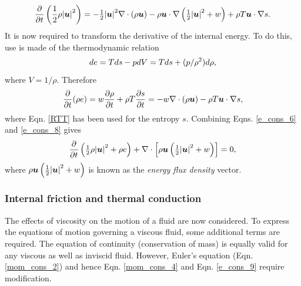 \begin{equation}\label{e_cons_6}
 \frac{\partial}{\partial{t}}\left(\frac{1}{2}\rho{|{\mbox{\boldmath$u$}}|}^{2}\right)=-{\textstyle \frac{1}{2}}{|{\mbox{\boldmath$u$}}|}^{2}\nabla\cdot(\rho{\mbox{\boldmath$u$}})
                                                                 -\rho{\mbox{\boldmath$u$}}\cdot\nabla\left({\textstyle \frac{1}{2}}{|{\mbox{\boldmath$u$}}|}^{2}+w\right)
                                                                 +\rho{T}{\mbox{\boldmath$u$}}\cdot\nabla{s}.
\end{equation}
It is now required to transform the derivative of the internal energy. To do this, use is made of the thermodynamic relation
\begin{equation}\label{e_cons_7}
 de=Tds-pdV=Tds+(p/\rho^{2})d\rho,
\end{equation}
where $V=1/\rho$. Therefore
\begin{equation}\label{e_cons_8}
 \frac{\partial}{\partial{t}}(\rho e)=w\frac{\partial\rho}{\partial{t}}+\rho{T}\frac{\partial{s}}{\partial{t}}
                                            =-w\nabla\cdot(\rho{\mbox{\boldmath$u$}})-\rho{T}{\mbox{\boldmath$u$}}\cdot\nabla{s},
\end{equation}
where Eqn. \ref{RTT} has been used for the entropy $s$. Combining Eqns. \ref{e_cons_6} and \ref{e_cons_8} gives
\begin{equation}\label{e_cons_9}
 \frac{\partial}{\partial{t}}\left({\textstyle \frac{1}{2}}\rho{|{\mbox{\boldmath$u$}}|}^{2}+\rho e\right)+\nabla\cdot\left[\rho{\mbox{\boldmath$u$}}\left({\textstyle \frac{1}{2}}{|{\mbox{\boldmath$u$}}|}^{2}+w\right)\right]=0,
\end{equation}
where $\rho{\mbox{\boldmath$u$}}\left({\textstyle \frac{1}{2}}{|{\mbox{\boldmath$u$}}|}^{2}+w\right)$ is known as the \textit{energy flux density} vector.

\subsubsection{Internal friction and thermal conduction}\label{Sect:stressed}
The effects of viscosity on the motion of a fluid are now considered. To express the equations of motion governing a viscous fluid, some additional terms are required. The equation of continuity (conservation of mass) is equally valid for any viscous as well as inviscid fluid. However, Euler's equation (Eqn. \ref{mom_cons_2}) and hence Eqn. \ref{mom_cons_4} and Eqn. \ref{e_cons_9} require modification.


